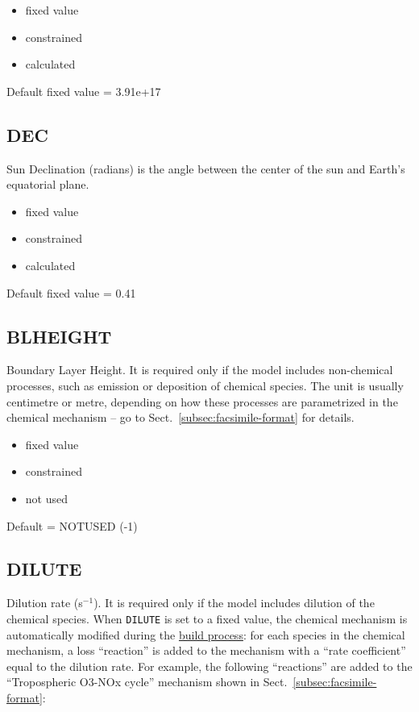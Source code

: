 \begin{itemize}
\item fixed value
\item constrained
\item calculated
\end{itemize}

Default fixed value = 3.91e+17

\subsection{DEC} \label{subsec:dec}

Sun Declination (radians) is the angle between the center of the sun
and Earth's equatorial plane.

\begin{itemize}
\item fixed value
\item constrained
\item calculated
\end{itemize}

Default fixed value = 0.41

\subsection{BLHEIGHT} \label{subsec:blheight}

Boundary Layer Height. It is required only if the model includes
non-chemical processes, such as emission or deposition of chemical
species. The unit is usually centimetre or metre, depending on how
these processes are parametrized in the chemical mechanism -- go to
Sect.~\ref{subsec:facsimile-format} for details.

\begin{itemize}
\item fixed value
\item constrained
\item not used
\end{itemize}

Default = NOTUSED (-1)

\subsection{DILUTE} \label{subsec:dilute}

Dilution rate (s$^{-1}$). It is required only if the model includes
dilution of the chemical species. When \texttt{DILUTE} is set to a
fixed value, the chemical mechanism is automatically modified during
the \hyperref[subsec:build-process]{build process}: for each species
in the chemical mechanism, a loss ``reaction'' is added to the
mechanism with a ``rate coefficient'' equal to the dilution rate. For
example, the following ``reactions'' are added to the ``Tropospheric
O3-NOx cycle'' mechanism shown in Sect.~\ref{subsec:facsimile-format}:

